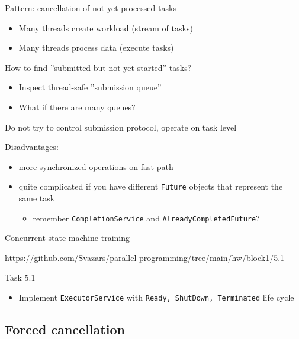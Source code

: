 \begin{frame}{Pattern: cancellation of not-yet-processed tasks}

\begin{itemize}
  \item Many threads create workload (stream of tasks)
  \item Many threads process data (execute tasks)
\end{itemize}

How to find ''submitted but not yet started'' tasks?

\begin{itemize}
  \item Inspect thread-safe ''submission queue''
  \pause \item What if there are many queues?
\end{itemize}

Do not try to control submission protocol, operate on task level

Disadvantages: 
\begin{itemize}
  \item more synchronized operations on fast-path
  \item quite complicated if you have different \texttt{Future} objects that represent the same task 
  \begin{itemize}
    \item remember \texttt{CompletionService} and \texttt{AlreadyCompletedFuture}?
  \end{itemize}
\end{itemize}
\end{frame}

\begin{frame}[fragile]{Concurrent state machine training}

{\small\url{https://github.com/Svazars/parallel-programming/tree/main/hw/block1/5.1}}
\begin{homeworkmail}{Task 5.1}
    \begin{itemize}
        \item Implement \texttt{ExecutorService} with \texttt{Ready, ShutDown, Terminated} life cycle
    \end{itemize}
\end{homeworkmail}
\end{frame}


\subsection{Forced cancellation}
\showTOCSub

